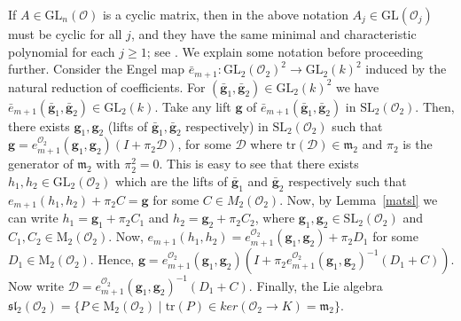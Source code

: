 \documentclass[10pt,twoside]{amsart}
\newcommand{\GL}{\mathrm{GL}}
\newcommand{\SL}{\mathrm{SL}}
\newcommand{\tr}{\mathrm{tr}}
\newcommand{\M}{\mathrm{M}}
\newcommand{\R}{\mathcal{O}_2}
\theoremstyle{definition}
\theoremstyle{definition}
\begin{document}
\noindent If $A\in\GL_n(\mathcal{O})$ is a cyclic matrix, then in the above notation $A_j\in \GL(\mathcal{O}_j)$ must be cyclic for all $j$, and they have the same minimal and characteristic polynomial for each $j\geq 1$; see \cite[corollary 2.3]{PRS2026}. We explain some notation before proceeding further. Consider the Engel map $\bar e_{m+1} \colon \GL_2(\mathcal{O}_2)^2 \rightarrow \GL_2(k)^2$ induced by the natural reduction of coefficients. For $(\mathbf{\bar g}_1, \mathbf{\bar g}_2) \in \GL_2(k)^2$ we have $\bar e_{m+1}(\mathbf{\bar g}_1,\mathbf{\bar g}_2)\in \GL_2(k)$. Take any lift $\mathbf{g}$ of $\bar e_{m+1}(\mathbf{\bar g}_1, \mathbf{\bar g}_2)$ in $\SL_2(\mathcal{O}_2)$. Then, there exists $\mathbf{g}_1, \mathbf{g}_2$ (lifts of $\mathbf{\bar g}_1, \mathbf{\bar g}_2$ respectively) in $\SL_2(\mathcal{O}_2)$ such that $\mathbf{g} = e_{m+1}^{\R}(\mathbf{g}_1, \mathbf{g}_2)(I+ \pi_2 \mathcal{D})$, for some $\mathcal D$ where $\tr(\mathcal{D})\in \mathfrak{m}_2$ and $\pi_2$ is the generator of $\mathfrak{m}_2$ with $\pi_2^2=0$. 
This is easy to see that there exists $h_1, h_2\in \GL_2(\mathcal{O}_2)$ which are the lifts of $\mathbf{\bar g}_1$ and $\mathbf{\bar g}_2$ respectively such that $e_{m+1}(h_1, h_2) + \pi_2 C = \mathbf{g}$ for some $C\in M_2(\mathcal{O}_2)$. Now, by Lemma~\ref{matsl} we can write $h_1 = \mathbf{g}_1 + \pi_2 C_1$ and $h_2 = \mathbf{g}_2 + \pi_2 C_2$, where $\mathbf{g}_1,\mathbf{g}_2\in \SL_2(\mathcal{O}_2)$ and $C_1, C_2 \in \M_2(\mathcal{O}_2)$. Now, $e_{m+1}(h_1, h_2) = e_{m+1}^{\R}(\mathbf{g}_1, \mathbf{g}_2) + \pi_2 D_1$ for some $D_1\in \M_2(\mathcal{O}_2)$. Hence, $\mathbf{g} = e_{m+1}^{\R}(\mathbf{g}_1,\mathbf{g}_2)\left(I+ \pi_2 e_{m+1}^{\R}(\mathbf{g}_1, \mathbf{g}_2)^{-1}(D_1 + C)\right)$. Now write $\mathcal{D}= e_{m+1}^{\R}(\mathbf{g}_1, \mathbf{g}_2)^{-1}(D_1 + C)$. Finally, the Lie algebra $\mathfrak{sl}_2(\mathcal{O}_2) = \{P \in \M_2(\mathcal{O}_2) \mid \tr(P) \in ker(\mathcal{O}_2 \rightarrow K) = \mathfrak{m}_2\}$.
\end{document}
